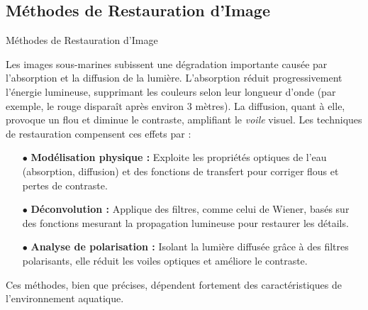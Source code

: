 \documentclass[8pt,a4paper]{beamer}
\numberwithin{figure}{section}
\begin{document}
\subsection{Méthodes de Restauration d'Image}
\begin{frame}{Méthodes de Restauration d'Image}
\par Les images sous-marines subissent une dégradation importante causée par l'absorption et la diffusion de la lumière. L'absorption réduit progressivement l'énergie lumineuse, supprimant les couleurs selon leur longueur d'onde (par exemple, le rouge disparaît après environ 3 mètres). La diffusion, quant à elle, provoque un flou et diminue le contraste, amplifiant le \textit{voile} visuel. Les techniques de restauration compensent ces effets par :
\vspace{3mm}
\begin{itemize}
\item[$\bullet$] \textbf{Modélisation physique :} Exploite les propriétés optiques de l'eau (absorption, diffusion) et des fonctions de transfert pour corriger flous et pertes de contraste.
\item[$\bullet$] \textbf{Déconvolution :} Applique des filtres, comme celui de Wiener, basés sur des fonctions mesurant la propagation lumineuse pour restaurer les détails.
\item[$\bullet$] \textbf{Analyse de polarisation :} Isolant la lumière diffusée grâce à des filtres polarisants, elle réduit les voiles optiques et améliore le contraste.
\end{itemize}
\vspace{3mm}
Ces méthodes, bien que précises, dépendent fortement des caractéristiques de l’environnement aquatique.
\end{frame}
\end{document}
